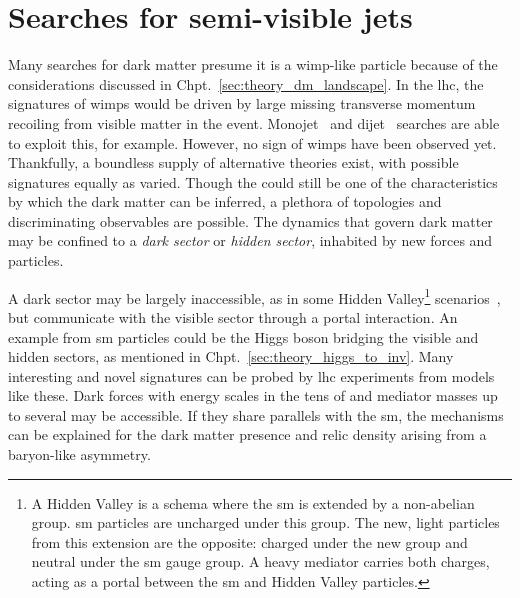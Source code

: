

\section{Searches for semi-visible jets}
\label{sec:theory_svj}

Many searches for dark matter presume it is a \acrshort{wimp}-like particle because of the considerations discussed in Chpt.~\ref{sec:theory_dm_landscape}. In the \acrshort{lhc}, the signatures of \glspl{wimp} would be driven by large missing transverse momentum recoiling from visible matter in the event. Monojet~\cite{Khachatryan:2014rra} and dijet~\cite{Sirunyan:2016iap} searches are able to exploit this, for example. However, no sign of \glspl{wimp} have been observed yet. Thankfully, a boundless supply of alternative theories exist, with possible signatures equally as varied. Though the \ptmiss could still be one of the characteristics by which the dark matter can be inferred, a plethora of topologies and discriminating observables are possible. The dynamics that govern dark matter may be confined to a \emph{dark sector} or \emph{hidden sector}, inhabited by new forces and particles.

A dark sector may be largely inaccessible, as in some Hidden Valley\footnote{A Hidden Valley is a schema where the \acrlong{sm} is extended by a non-abelian group. \acrshort{sm} particles are uncharged under this group. The new, light particles from this extension are the opposite: charged under the new group and neutral under the \acrshort{sm} gauge group. A heavy mediator carries both charges, acting as a portal between the \acrlong{sm} and Hidden Valley particles.} scenarios~\cite{Strassler:2006im}, but communicate with the visible sector through a portal interaction. An example from \acrshort{sm} particles could be the Higgs boson bridging the visible and hidden sectors, as mentioned in Chpt.~\ref{sec:theory_higgs_to_inv}. Many interesting and novel signatures can be probed by \acrshort{lhc} experiments from models like these. Dark forces with energy scales in the tens of \GeVns and mediator masses up to several \TeVns may be accessible. If they share parallels with the \acrlong{sm}, the mechanisms can be explained for the dark matter presence and relic density arising from a baryon-like asymmetry.

